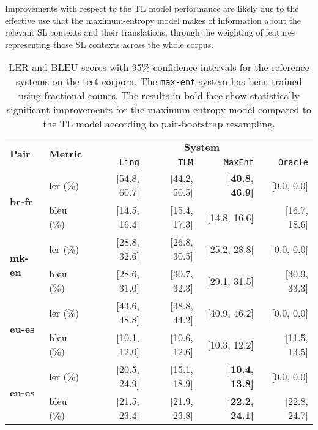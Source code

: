 \documentclass[11pt]{article}
\newcommand{\comment}[1]{\todo{#1}}
\begin{document}
 Improvements with respect to the TL model performance are likely due
 to the effective use that the maximum-entropy model makes of
 information about the relevant SL contexts and their translations,
 through the weighting of features representing those SL contexts
 across the whole corpus.


\begin{table*}
 \begin{center}

  \begin{tabular}{|l|l|r|r|r||r|}
    \hline
    \multirow{2}{*}{{\bf Pair}}  & \multirow{2}{*}{{\bf Metric}} & \multicolumn{4}{|c|}{{\bf System}} \\ \cline{3-6}
                                 &              & {\tt Ling} & {\tt TLM} & \texttt{MaxEnt} & \texttt{Oracle} \\
    \hline %
    \multirow{2}{*}{{\bf br-fr}} & {\sc ler} (\%)     & [54.8, 60.7] & [44.2, 50.5]  & {\bf [40.8, 46.9]} & [0.0, 0.0]      \\ 
                                 & {\sc bleu} (\%)    & [14.5, 16.4] & [15.4, 17.3]  & [14.8, 16.6] & [16.7, 18.6]     \\ 
    \hline %
    \multirow{2}{*}{{\bf mk-en}} & {\sc ler} (\%)     & [28.8, 32.6] & [26.8, 30.5]  & [25.2, 28.8] & [0.0, 0.0]    \\ 
                                 & {\sc bleu} (\%)    & [28.6, 31.0] & [30.7, 32.3]  & [29.1, 31.5] & [30.9, 33.3]    \\ 
    \hline %
    \multirow{2}{*}{{\bf eu-es}} & {\sc ler} (\%)      & [43.6, 48.8] & [38.8, 44.2]  & [40.9, 46.2] & [0.0, 0.0]     \\ 
                                 & {\sc bleu} (\%)     & [10.1, 12.0] & [10.6, 12.6]  & [10.3, 12.2] & [11.5, 13.5]     \\ 
    \hline %
    \multirow{2}{*}{{\bf en-es}} & {\sc ler} (\%)      & [20.5, 24.9] & [15.1, 18.9]  & {\bf [10.4, 13.8]} & [0.0, 0.0]     \\ 
                                 & {\sc bleu} (\%)     & [21.5, 23.4] & [21.9, 23.8]  & {\bf [22.2, 24.1]} & [22.8, 24.7]     \\ 
    \hline
  \end{tabular}

 \end{center}
 \caption{LER and BLEU scores with 95\% confidence intervals for the reference
   systems on the test corpora. The \texttt{max-ent} system has been trained using 
   fractional counts. The results in bold face show statistically significant
   improvements for the maximum-entropy model compared to the TL model 
   according to pair-bootstrap resampling.}
  \label{table:eval-mono-results}
\end{table*}
\end{document}
